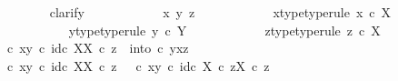 \begin{isabellebody}
\ \ \ \ \ \ \ \ \isamarkupfalse%
{\isacharparenleft}{\kern0pt}clarify{\isacharparenright}{\kern0pt}\isanewline
\ \ \ \ \ \ \ \ \ \ \isamarkupfalse%
\ x\ y\ z\isanewline
\ \ \ \ \ \ \ \ \ \ \isamarkupfalse%
\ x{\isacharunderscore}{\kern0pt}type{\isacharbrackleft}{\kern0pt}type{\isacharunderscore}{\kern0pt}rule{\isacharbrackright}{\kern0pt}{\isacharcolon}{\kern0pt}\ {\isachardoublequoteopen}x\ {\isasymin}\isactrlsub c\ X{\isachardoublequoteclose}\isanewline
\ \ \ \ \ \ \ \ \ \ \isamarkupfalse%
\ y{\isacharunderscore}{\kern0pt}type{\isacharbrackleft}{\kern0pt}type{\isacharunderscore}{\kern0pt}rule{\isacharbrackright}{\kern0pt}{\isacharcolon}{\kern0pt}\ {\isachardoublequoteopen}y\ {\isasymin}\isactrlsub c\ Y{\isachardoublequoteclose}\isanewline
\ \ \ \ \ \ \ \ \ \ \isamarkupfalse%
\ z{\isacharunderscore}{\kern0pt}type{\isacharbrackleft}{\kern0pt}type{\isacharunderscore}{\kern0pt}rule{\isacharbrackright}{\kern0pt}{\isacharcolon}{\kern0pt}\ {\isachardoublequoteopen}z\ {\isasymin}\isactrlsub c\ X{\isachardoublequoteclose}\isanewline
\ \ \ \ \ \ \ \ \ \ \isamarkupfalse%
\ {\isachardoublequoteopen}{\isacharparenleft}{\kern0pt}{\isasymTheta}\ {\isasymcirc}\isactrlsub c\ {\isasymlangle}x{\isacharcomma}{\kern0pt}y{\isasymrangle}{\isacharparenright}{\kern0pt}\isactrlsup {\isasymflat}\ {\isasymcirc}\isactrlsub c\ {\isasymlangle}id\isactrlsub c\ X{\isacharcomma}{\kern0pt}{\isasymbeta}\isactrlbsub X\isactrlesub {\isasymrangle}\ {\isasymcirc}\isactrlsub c\ z\ {\isacharequal}{\kern0pt}\ into\ {\isasymcirc}\isactrlsub c\ {\isasymlangle}y{\isacharcomma}{\kern0pt}{\isasymlangle}x{\isacharcomma}{\kern0pt}z{\isasymrangle}{\isasymrangle}{\isachardoublequoteclose}\isanewline
\ \ \ \ \ \ \ \ \ \ \isamarkupfalse%
\ {\isacharminus}{\kern0pt}\ \isanewline
\ \ \ \ \ \ \ \ \ \ \ \ \isamarkupfalse%
\ {\isachardoublequoteopen}{\isacharparenleft}{\kern0pt}{\isasymTheta}\ {\isasymcirc}\isactrlsub c\ {\isasymlangle}x{\isacharcomma}{\kern0pt}y{\isasymrangle}{\isacharparenright}{\kern0pt}\isactrlsup {\isasymflat}\ {\isasymcirc}\isactrlsub c\ {\isasymlangle}id\isactrlsub c\ X{\isacharcomma}{\kern0pt}{\isasymbeta}\isactrlbsub X\isactrlesub {\isasymrangle}\ {\isasymcirc}\isactrlsub c\ z\ {\isacharequal}{\kern0pt}\ {\isacharparenleft}{\kern0pt}{\isasymTheta}\ {\isasymcirc}\isactrlsub c\ {\isasymlangle}x{\isacharcomma}{\kern0pt}y{\isasymrangle}{\isacharparenright}{\kern0pt}\isactrlsup {\isasymflat}\ {\isasymcirc}\isactrlsub c\ {\isasymlangle}id\isactrlsub c\ X\ {\isasymcirc}\isactrlsub c\ z{\isacharcomma}{\kern0pt}{\isasymbeta}\isactrlbsub X\isactrlesub \ {\isasymcirc}\isactrlsub c\ z{\isasymrangle}{\isachardoublequoteclose}\isanewline

\end{isabellebody}
